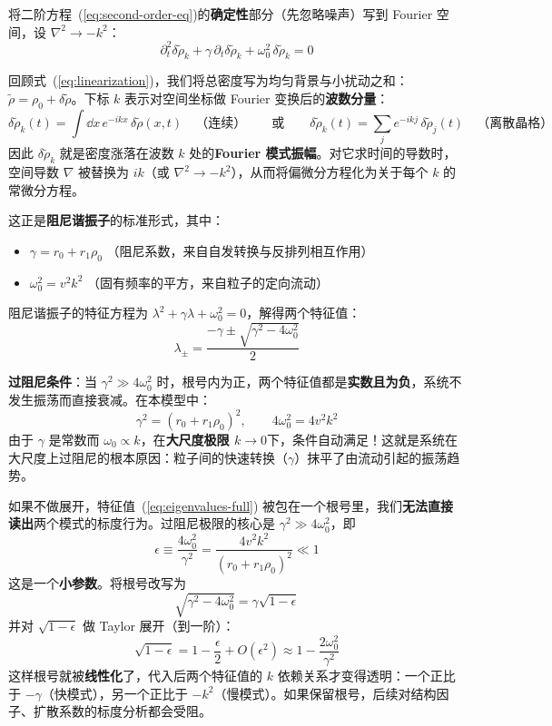 \begin{derivation}
将二阶方程~(\ref{eq:second-order-eq})的\textbf{确定性}部分（先忽略噪声）写到 Fourier 空间，设 $\nabla^2 \to -k^2$：
\begin{equation}\label{eq:damped-oscillator}
\partial_t^2 \delta\tilde{\rho}_k + \gamma\,\partial_t \delta\tilde{\rho}_k + \omega_0^2\,\delta\tilde{\rho}_k = 0
\end{equation}

\begin{notebox}
回顾式~(\ref{eq:linearization})，我们将总密度写为均匀背景与小扰动之和：$\tilde{\rho} = \rho_0 + \delta\tilde{\rho}$。下标 $k$ 表示对空间坐标做 Fourier 变换后的\textbf{波数分量}：
\[
\delta\tilde{\rho}_k(t) = \int \dd x\, e^{-ikx}\,\delta\tilde{\rho}(x,t)
\quad\text{（连续）}\qquad\text{或}\qquad
\delta\tilde{\rho}_k(t) = \sum_j e^{-ikj}\,\delta\tilde{\rho}_j(t)
\quad\text{（离散晶格）}
\]
因此 $\delta\tilde{\rho}_k$ 就是密度涨落在波数 $k$ 处的\textbf{Fourier 模式振幅}。对它求时间的导数时，空间导数 $\nabla$ 被替换为 $ik$（或 $\nabla^2 \to -k^2$），从而将偏微分方程化为关于每个 $k$ 的常微分方程。
\end{notebox}
这正是\textbf{阻尼谐振子}的标准形式，其中：
\begin{itemize}
    \item $\gamma = r_0 + r_1\rho_0$ \quad（阻尼系数，来自自发转换与反排列相互作用）
    \item $\omega_0^2 = v^2 k^2$ \quad（固有频率的平方，来自粒子的定向流动）
\end{itemize}

阻尼谐振子的特征方程为 $\lambda^2 + \gamma\lambda + \omega_0^2 = 0$，解得两个特征值：
\begin{equation}\label{eq:eigenvalues-full}
\lambda_{\pm} = \frac{-\gamma \pm \sqrt{\gamma^2 - 4\omega_0^2}}{2}
\end{equation}

\textbf{过阻尼条件}：当 $\gamma^2 \gg 4\omega_0^2$ 时，根号内为正，两个特征值都是\textbf{实数且为负}，系统不发生振荡而直接衰减。在本模型中：
\[
\gamma^2 = (r_0 + r_1\rho_0)^2, \qquad 4\omega_0^2 = 4v^2 k^2
\]
由于 $\gamma$ 是常数而 $\omega_0 \propto k$，在\textbf{大尺度极限 $k \to 0$}下，条件自动满足！这就是系统在大尺度上过阻尼的根本原因：粒子间的快速转换（$\gamma$）抹平了由流动引起的振荡趋势。

\begin{remark}
如果不做展开，特征值~(\ref{eq:eigenvalues-full}) 被包在一个根号里，我们\textbf{无法直接读出}两个模式的标度行为。过阻尼极限的核心是 $\gamma^2 \gg 4\omega_0^2$，即
\[
\epsilon \equiv \frac{4\omega_0^2}{\gamma^2} = \frac{4v^2 k^2}{(r_0 + r_1\rho_0)^2} \ll 1
\]
这是一个\textbf{小参数}。将根号改写为
\[
\sqrt{\gamma^2 - 4\omega_0^2} = \gamma\sqrt{1 - \epsilon}
\]
并对 $\sqrt{1 - \epsilon}$ 做 Taylor 展开（到一阶）：
\[
\sqrt{1 - \epsilon} = 1 - \frac{\epsilon}{2} + O(\epsilon^2) \approx 1 - \frac{2\omega_0^2}{\gamma^2}
\]
这样根号就被\textbf{线性化}了，代入后两个特征值的 $k$ 依赖关系才变得透明：一个正比于 $-\gamma$（快模式），另一个正比于 $-k^2$（慢模式）。如果保留根号，后续对结构因子、扩散系数的标度分析都会受阻。
\end{remark}


\end{derivation}
